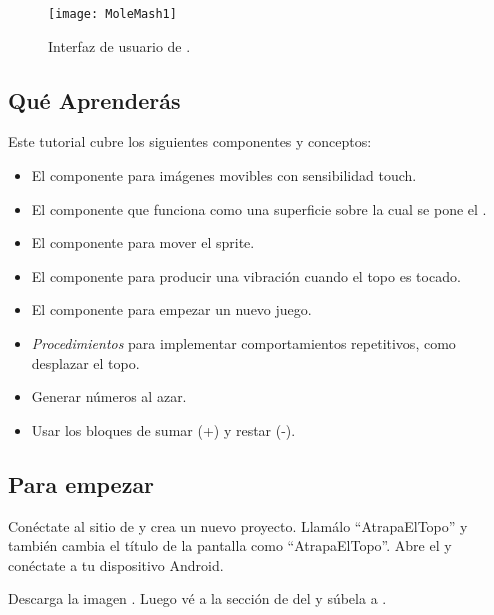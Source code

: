\begin{figure}[H]
\centering
\texttt{[image: MoleMash1]}
\caption{ Interfaz de usuario de .}
\label{fig:MoleMash1}
\end{figure}


\subsection*{Qué Aprenderás}

Este tutorial cubre los siguientes componentes y conceptos:

\begin{itemize}

\item El componente  para imágenes movibles
  con sensibilidad touch.

\item El componente  que funciona como una
  superficie sobre la cual se pone el .

\item El componente  para mover el sprite.

\item El componente  para producir una vibración
  cuando el topo es tocado.

\item El componente  para empezar un nuevo juego.

\item \emph{Procedimientos} para implementar comportamientos
  repetitivos, como desplazar el topo.

\item Generar números al azar.

\item Usar los bloques de sumar (+) y restar (-).
\end{itemize}

\subsection*{Para empezar}

Conéctate al sitio de \AppInventor y crea un nuevo proyecto. Llamálo
``AtrapaElTopo'' y también cambia el título de la pantalla como
``AtrapaElTopo''. Abre el \blockEditor y conéctate a tu dispositivo Android.

Descarga la imagen . Luego vé
a la sección de \media del \componentDesigner y súbela a \AppInventor.

